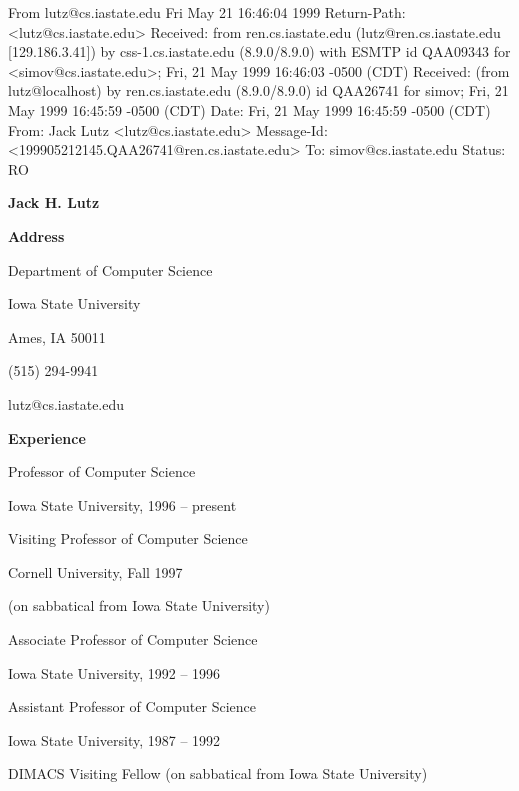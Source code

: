 From lutz@cs.iastate.edu  Fri May 21 16:46:04 1999
Return-Path: <lutz@cs.iastate.edu>
Received: from ren.cs.iastate.edu (lutz@ren.cs.iastate.edu [129.186.3.41])
	by css-1.cs.iastate.edu (8.9.0/8.9.0) with ESMTP id QAA09343
	for <simov@cs.iastate.edu>; Fri, 21 May 1999 16:46:03 -0500 (CDT)
Received: (from lutz@localhost)
	by ren.cs.iastate.edu (8.9.0/8.9.0) id QAA26741
	for simov; Fri, 21 May 1999 16:45:59 -0500 (CDT)
Date: Fri, 21 May 1999 16:45:59 -0500 (CDT)
From: Jack Lutz <lutz@cs.iastate.edu>
Message-Id: <199905212145.QAA26741@ren.cs.iastate.edu>
To: simov@cs.iastate.edu
Status: RO

\setlength{\topmargin}{-.5in}
\setlength{\textheight}{9in}
\setlength{\textwidth}{6.5in}
\setlength{\oddsidemargin}{0in}
\setlength{\evensidemargin}{0in}
\newlength{\Num}
\setlength{\parindent}{0in}
\pagestyle{empty}

\begin{center}
{\Large\bf Jack H. Lutz}
\end{center}

\vspace*{0.3in}
{\bf Address}

\vspace*{\smallskipamount}
Department of Computer Science 

Iowa State University

Ames, IA 50011

(515) 294-9941

lutz@cs.iastate.edu

\vspace*{\bigskipamount}
{\bf Experience}

\vspace*{\medskipamount}

Professor of Computer Science

Iowa State University, 1996 -- present

\medskip
Visiting Professor of Computer Science

Cornell University, Fall 1997

(on sabbatical from Iowa State University)

\medskip
Associate Professor of Computer Science

Iowa State University, 1992 -- 1996

\medskip
Assistant Professor of Computer Science

Iowa State University, 1987 -- 1992

\medskip
DIMACS Visiting Fellow (on sabbatical from Iowa State University)

